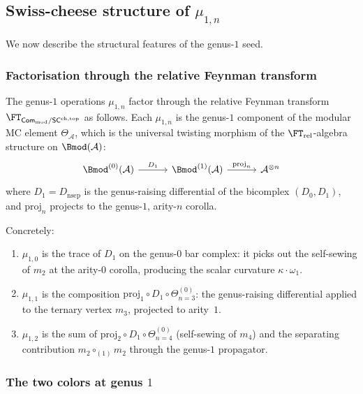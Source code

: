 \documentclass[11pt]{article}
\newcommand{\cA}{\mathcal{A}}
\newcommand{\Com}{\mathsf{Com}}
\newcommand{\SCchtop}{\mathsf{SC}^{\mathrm{ch,top}}}
\begin{document}
\subsection{Swiss-cheese structure of $\mu_{1,n}$}

We now describe the structural features of the genus-$1$ seed.

\subsubsection{Factorisation through the relative Feynman transform}

\begin{proposition}
\label{prop:wn-mu1n-factorisation}
The genus-$1$ operations $\mu_{1,n}$ factor through the relative
Feynman transform $\FT_{\Com_{\mathrm{mod}}/\SCchtop}$ as follows.
Each $\mu_{1,n}$ is the genus-$1$ component of the modular
MC element $\Theta_\cA$, which is the universal twisting morphism
of the $\FT_{\mathrm{rel}}$-algebra structure on $\Bmod(\cA)$:
\[
\begin{tikzcd}[column sep=3em]
\Bmod^{(0)}(\cA)
\ar[r, "D_1"]
&
\Bmod^{(1)}(\cA)
\ar[r, "\mathrm{proj}_{n}"]
&
\cA^{\otimes n}
\end{tikzcd}
\]
where $D_1 = D_{\mathrm{nsep}}$ is the genus-raising differential
of the bicomplex $(D_0, D_1)$, and $\mathrm{proj}_n$ projects to
the genus-$1$, arity-$n$ corolla.
\end{proposition}

Concretely:
\begin{enumerate}[label=\textup{(\roman*)}]
\item $\mu_{1,0}$ is the trace of $D_1$ on the genus-$0$ bar
  complex: it picks out the self-sewing of $m_2$ at the arity-$0$
  corolla, producing the scalar curvature $\kappa \cdot \omega_1$.
\item $\mu_{1,1}$ is the composition $\mathrm{proj}_1 \circ D_1
  \circ \Theta^{(0)}_{n=3}$: the genus-raising differential applied
  to the ternary vertex $m_3$, projected to arity~$1$.
\item $\mu_{1,2}$ is the sum of $\mathrm{proj}_2 \circ D_1
  \circ \Theta^{(0)}_{n=4}$ (self-sewing of $m_4$) and the
  separating contribution $m_2 \circ_{(1)} m_2$ through the
  genus-$1$ propagator.
\end{enumerate}

\subsubsection{The two colors at genus $1$}
\end{document}
